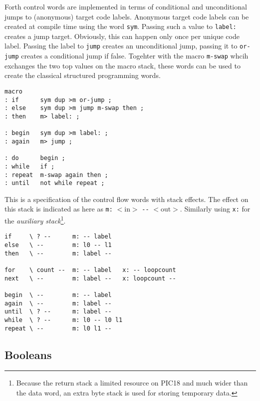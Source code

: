 \documentclass[12pt]{article}
\begin{document}
Forth control words are implemented in terms of conditional and
unconditional jumps to (anonymous) target code labels.  Anonymous
target code labels can be created at compile time using the word
\verb|sym|. Passing such a value to \verb|label:| creates a jump
target. Obviously, this can happen only once per unique code
label. Passing the label to \verb|jump| creates an unconditional jump,
passing it to \verb|or-jump| creates a conditional jump if
false. Togehter with the macro \verb|m-swap| whcih exchanges the two
top values on the macro stack, these words can be used to create the
classical structured programming words.
\begin{verbatim}
macro
: if      sym dup >m or-jump ;
: else    sym dup >m jump m-swap then ;
: then    m> label: ;

: begin   sym dup >m label: ;
: again   m> jump ;

: do      begin ;
: while   if ;
: repeat  m-swap again then ;
: until   not while repeat ;
\end{verbatim}
This is a specification of the control flow words with stack effects.
The effect on this stack is indicated as here as \verb|m:|
$<\text{in}>$ \verb|--| $<\text{out}>$. Similarly using \verb|x:| for
the \emph{auxiliary stack}\footnote{Because the return stack a limited
resource on PIC18 and much wider than the data word, an extra byte
stack is used for storing temporary data.}.
\begin{verbatim}
if     \ ? --      m: -- label
else   \ --        m: l0 -- l1
then   \ --        m: label --

for    \ count --  m: -- label   x: -- loopcount
next   \ --        m: label --   x: loopcount -- 

begin  \ --        m: -- label
again  \ --        m: label --
until  \ ? --      m: label --
while  \ ? --      m: l0 -- l0 l1
repeat \ --        m: l0 l1 --

\end{verbatim}



\subsection{Booleans}
\end{document}
